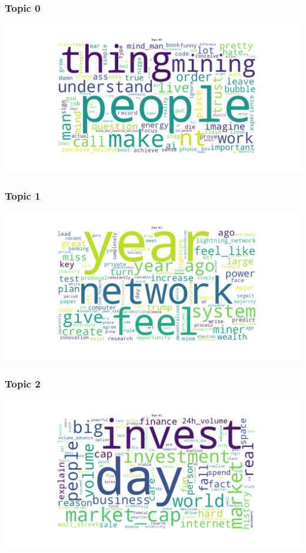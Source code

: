 \documentclass[
]{article}
\begin{document}
\hypertarget{topic-0}{%
\subsubsection{Topic 0}\label{topic-0}}

\includegraphics[width=7.8125in,height=\textheight]{images/03 - Topic_0.png}

\hypertarget{topic-1}{%
\subsubsection{Topic 1}\label{topic-1}}

\includegraphics[width=7.8125in,height=\textheight]{images/03 - Topic_1.png}

\hypertarget{topic-2}{%
\subsubsection{Topic 2}\label{topic-2}}

\includegraphics[width=7.8125in,height=\textheight]{images/03 - Topic_2.png}
\end{document}
